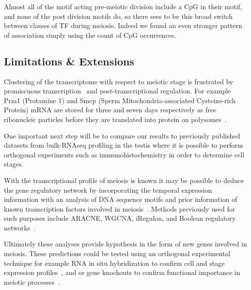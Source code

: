 Almost all of the motif acting pre-meiotic division include a CpG in their motif, and none of the post division motifs do, so there sees to be this broad switch between classes of TF during meiosis. Indeed we found an even stronger pattern of association simply using the count of CpG occurrences.



\subsection{Limitations \& Extensions}
Clustering of the transcriptome with respect to meiotic stage is frustrated by promiscuous transcription~\cite{Soumillon2013Cellular} and post-transcriptional regulation. For example Prm1 (Protamine 1) and Smcp (Sperm Mitochondria-associated Cysteine-rich Protein) mRNA are stored for three and seven days respectively as free ribonucleic particles before they are translated into protein on polysomes~\cite{Cullinane2015Mechanisms, Kleene1984Translational, Kleene2004Patterns}.



One important next step will be to compare our results to previously published datasets from bulk-RNAseq profiling in the testis where it is possible to perform orthogonal experiments such as immunohistochemistry in order to determine cell stages.


With the transcriptional profile of meiosis is known it may be possible to deduce the gene regulatory network by incorporating the temporal expression information with an analysis of DNA sequence motifs and prior information of known transcription factors involved in meiosis~\cite{PadovanMerhar2013Using, Goutsias2007Computational}. Methods previously used for such purposes include ARACNE, WGCNA, iRegulon, and Boolean regulatory networks~\cite{Margolin2006Reverse, Zhang2005General, Janky2014IRegulon, Moignard2013Characterization}.

Ultimately these analyses provide hypothesis in the form of new genes involved in meiosis. These predictions could be tested using an orthogonal experimental technique for example RNA in situ hybridization to confirm cell and stage expression profiles~\cite{Moffitt2016Highperformance,Choi2016Mapping}, and or gene knockouts to confirm functional importance in meiotic processes~\cite{Jamsai2010Mouse}.
